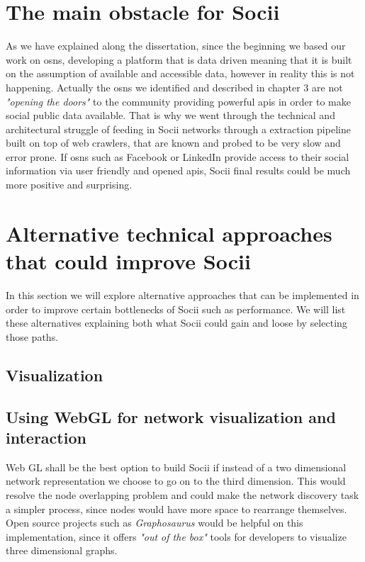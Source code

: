 \section{The main obstacle for Socii}
As we have explained along the dissertation, since the beginning we based our work on \glspl{osn}, developing a platform that is data driven meaning that it is built on the assumption of available and accessible data, however in reality this is not happening. Actually the \glspl{osn} we identified and described in chapter 3 are not \textit{"opening the doors"} to the community providing powerful \glspl{api} in order to make social public data available. That is why we went through the technical and architectural struggle of feeding in Socii networks through a extraction pipeline built on top of web crawlers, that are known and probed to be very slow and error prone. If \glspl{osn} such as Facebook or LinkedIn provide access to their social information via user friendly and opened \glspl{api}, Socii final results could be much more positive and surprising.

\section{Alternative technical approaches that could improve Socii}
In this section we will explore alternative approaches that can be implemented in order to improve certain bottlenecks of Socii such as performance. We will list these alternatives explaining both what Socii could gain and loose by selecting those paths.

\subsection{Visualization}

\subsection*{Using WebGL for network visualization and interaction}
Web GL \citep{marrin2011webgl} shall be the best option to build Socii if instead of a two dimensional network representation we choose to go on to the third dimension. This would resolve the node overlapping problem and could make the network discovery task a simpler process, since nodes would have more space to rearrange themselves. Open source projects such as \emph{Graphosaurus} \citep{graphosaurus} would be helpful on this implementation, since it offers \textit{"out of the box"} tools for developers to visualize three dimensional graphs.

